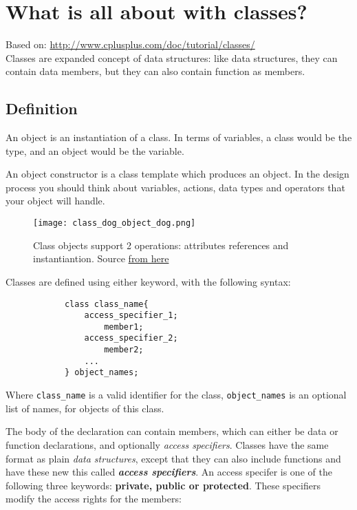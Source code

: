 \section{What is all about with classes? }

	Based on: \url{http://www.cplusplus.com/doc/tutorial/classes/} \\
	Classes are expanded concept of data structures: like data structures, they can contain data members, but they can also contain function as members. 

	\subsection{Definition}
		An object is an instantiation of a class. In terms of variables, a class would be the type, and an object would be the variable. 

		An object constructor is a class template which produces an object. In the design process you should think about variables, actions, data types and operators that your object will handle.  


			\begin{figure}[h]
					\centering
					 \texttt{[image: class\_dog\_object\_dog.png]}
					 \label{Examples of class and objects}
					 \caption{Class objects support 2 operations: attributes references  and instantiantion. Source \href{http://www.universocomputacao.com/images/dog.gif}{from here} }
			\end{figure}


		
		Classes are defined using either keyword, with the following syntax:

		\begin{verbatim}
			class class_name{
				access_specifier_1; 
					member1; 
				access_specifier_2;
					member2;
				...
			} object_names;

		\end{verbatim}

		Where \verb|class_name| is a valid identifier for the class, \verb|object_names| is an optional list of names, for objects of this class. 

		The body of the declaration can contain members, which can either be data or function declarations, and optionally \textit{access specifiers}.  Classes have the same format as plain \textit{data structures}, except that they can also include functions and have these new this called \textbf{\textit{access specifiers}}. An access specifer is one of the following three keywords: \textbf{private, public or protected}. These specifiers modify the access rights for the members: 

